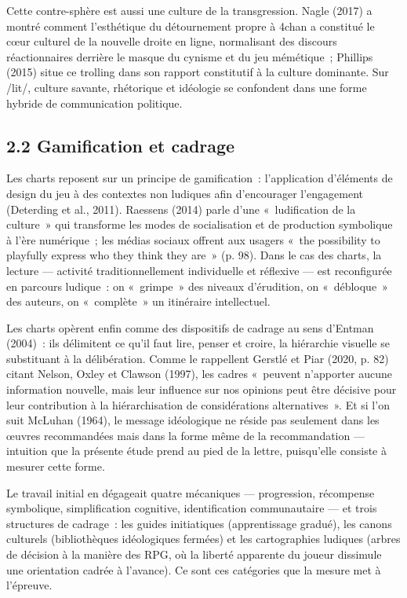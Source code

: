 \documentclass[11pt,a4paper]{article}
\begin{document}
Cette contre-sphère est aussi une culture de la transgression. Nagle (2017) a montré comment l'esthétique du détournement propre à 4chan a constitué le cœur culturel de la nouvelle droite en ligne, normalisant des discours réactionnaires derrière le masque du cynisme et du jeu mémétique~; Phillips (2015) situe ce trolling dans son rapport constitutif à la culture dominante. Sur /lit/, culture savante, rhétorique et idéologie se confondent dans une forme hybride de communication politique.

\subsection*{2.2 Gamification et cadrage}

Les charts reposent sur un principe de gamification~: l'application d'éléments de design du jeu à des contextes non ludiques afin d'encourager l'engagement (Deterding et al., 2011). Raessens (2014) parle d'une «~ludification de la culture~» qui transforme les modes de socialisation et de production symbolique à l'ère numérique~; les médias sociaux offrent aux usagers «~the possibility to playfully express who they think they are~» (p. 98). Dans le cas des charts, la lecture --- activité traditionnellement individuelle et réflexive --- est reconfigurée en parcours ludique~: on «~grimpe~» des niveaux d'érudition, on «~débloque~» des auteurs, on «~complète~» un itinéraire intellectuel.

Les charts opèrent enfin comme des dispositifs de cadrage au sens d'Entman (2004)~: ils délimitent ce qu'il faut lire, penser et croire, la hiérarchie visuelle se substituant à la délibération. Comme le rappellent Gerstlé et Piar (2020, p. 82) citant Nelson, Oxley et Clawson (1997), les cadres «~peuvent n'apporter aucune information nouvelle, mais leur influence sur nos opinions peut être décisive pour leur contribution à la hiérarchisation de considérations alternatives~». Et si l'on suit McLuhan (1964), le message idéologique ne réside pas seulement dans les œuvres recommandées mais dans la forme même de la recommandation --- intuition que la présente étude prend au pied de la lettre, puisqu'elle consiste à mesurer cette forme.

Le travail initial en dégageait quatre mécaniques --- progression, récompense symbolique, simplification cognitive, identification communautaire --- et trois structures de cadrage~: les guides initiatiques (apprentissage gradué), les canons culturels (bibliothèques idéologiques fermées) et les cartographies ludiques (arbres de décision à la manière des RPG, où la liberté apparente du joueur dissimule une orientation cadrée à l'avance). Ce sont ces catégories que la mesure met à l'épreuve.
\end{document}
